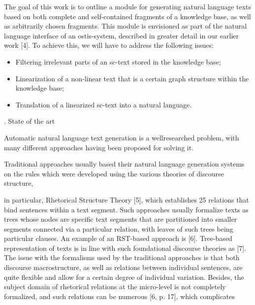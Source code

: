 \documentclass{scndocument}
\begin{document}
\begin{SCn}
\begin{multicols}{2}
\begin{justify}
The goal of this work is to outline a module for generating natural language texts based on both complete and self-contained fragments of a knowledge base, as well as arbitrarily chosen fragments. This module is envisioned as part of the natural language interface of an ostis-system, described in greater detail in our earlier work [4]. To achieve this, we will have to address the following issues:
\end{justify}
\begin{itemize}
\item Filtering irrelevant parts of an sc-text stored in the knowledge base;
\item Linearization of a non-linear text that is a certain graph structure within the knowledge base; 
\item Translation of a linearized sc-text into a natural language.
\end{itemize}
\vspace{0.5cm}
\centerline{\MakeUppercase{}. State of the art} 
\vspace{0.3cm}
\setlength{\parindent}{1em}
\begin{justify}
Automatic natural language text generation is a wellresearched problem, with many different approaches having been proposed for solving it.
\par Traditional approaches usually based their natural language generation systems on the rules which were developed using the various theories of discourse structure, 
\end{justify}
\newpage
\setlength{\parindent}{1em}
\begin{justify}
in particular, Rhetorical Structure Theory [5], which
establishes 25 relations that bind sentences within a text
segment. Such approaches usually formalize texts as trees
whose nodes are specific text segments that are partitioned into smaller segments connected via a particular
relation, with leaves of such trees being particular clauses.
An example of an RST-based approach is [6]. Tree-based
representation of texts is in line with such foundational
discourse theories as [7].\\
The issue with the formalisms used by the traditional
approaches is that both discourse macrostructure, as well
as relations between individual sentences, are quite flexible and allow for a certain degree of individual variation.
Besides, the subject domain of rhetorical relations at
the micro-level is not completely formalized, and such
relations can be numerous [6, p. 17], which complicates

\end{justify}
\end{multicols}
\end{SCn}
\end{document}

